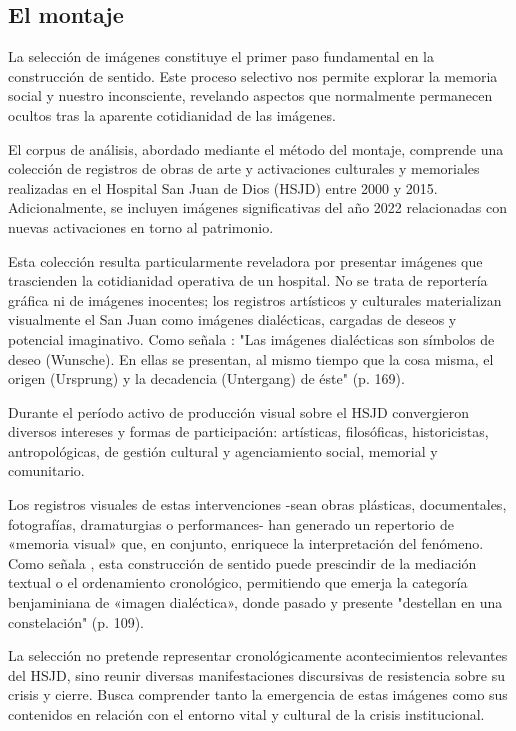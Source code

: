 \subsection*{El montaje}

La selección de imágenes constituye el primer paso fundamental en la construcción de sentido. Este proceso selectivo nos permite explorar la memoria social y nuestro inconsciente, revelando aspectos que normalmente permanecen ocultos tras la aparente cotidianidad de las imágenes.

El corpus de análisis, abordado mediante el método del montaje, comprende una colección de registros de obras de arte y activaciones culturales y memoriales realizadas en el Hospital San Juan de Dios (HSJD) entre 2000 y 2015. Adicionalmente, se incluyen imágenes significativas del año 2022 relacionadas con nuevas activaciones en torno al patrimonio.

Esta colección resulta particularmente reveladora por presentar imágenes que trascienden la cotidianidad operativa de un hospital. No se trata de reportería gráfica ni de imágenes inocentes; los registros artísticos y culturales materializan visualmente el San Juan como imágenes dialécticas, cargadas de deseos y potencial imaginativo. Como señala \parencite{DidiHuberman2011}: "Las imágenes dialécticas son símbolos de deseo (Wunsche). En ellas se presentan, al mismo tiempo que la cosa misma, el origen (Ursprung) y la decadencia (Untergang) de éste" (p. 169).

Durante el período activo de producción visual sobre el HSJD convergieron diversos intereses y formas de participación: artísticas, filosóficas, historicistas, antropológicas, de gestión cultural y agenciamiento social, memorial y comunitario.

Los registros visuales de estas intervenciones -sean obras plásticas, documentales, fotografías, dramaturgias o performances- han generado un repertorio de «memoria visual» que, en conjunto, enriquece la interpretación del fenómeno. Como señala \parencite{Abril2007}, esta construcción de sentido puede prescindir de la mediación textual o el ordenamiento cronológico, permitiendo que emerja la categoría benjaminiana de «imagen dialéctica», donde pasado y presente "destellan en una constelación" (p. 109).

La selección no pretende representar cronológicamente acontecimientos relevantes del HSJD, sino reunir diversas manifestaciones discursivas de resistencia sobre su crisis y cierre. Busca comprender tanto la emergencia de estas imágenes como sus contenidos en relación con el entorno vital y cultural de la crisis institucional.

